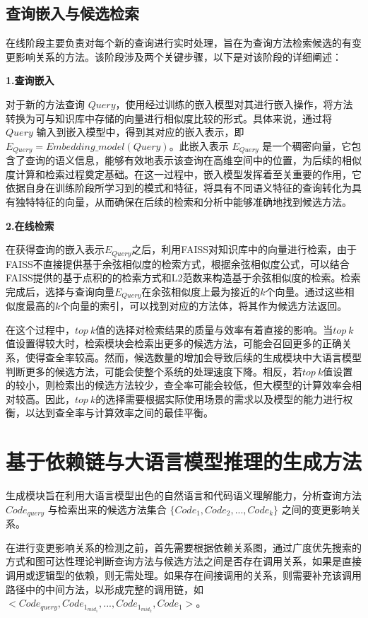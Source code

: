 \subsection{查询嵌入与候选检索}

在线阶段主要负责对每个新的查询进行实时处理，旨在为查询方法检索候选的有变更影响关系的方法。该阶段涉及两个关键步骤，以下是对该阶段的详细阐述：

\noindent \textbf{1.查询嵌入}

对于新的方法查询 $Query$，使用经过训练的嵌入模型对其进行嵌入操作，将方法转换为可与知识库中存储的向量进行相似度比较的形式。具体来说，通过将 $Query$ 输入到嵌入模型中，得到其对应的嵌入表示，即 $E_{Query}=Embedding\_model(Query)$。此嵌入表示 $E_{Query}$ 是一个稠密向量，它包含了查询的语义信息，能够有效地表示该查询在高维空间中的位置，为后续的相似度计算和检索过程奠定基础。在这一过程中，嵌入模型发挥着至关重要的作用，它依据自身在训练阶段所学习到的模式和特征，将具有不同语义特征的查询转化为具有独特特征的向量，从而确保在后续的检索和分析中能够准确地找到候选方法。

\noindent \textbf{2.在线检索}

在获得查询的嵌入表示$E_{Query}$之后，利用FAISS对知识库中的向量进行检索，由于FAISS不直接提供基于余弦相似度的检索方式，根据余弦相似度公式，可以结合FAISS提供的基于点积的的检索方式和L2范数来构造基于余弦相似度的检索。检索完成后，选择与查询向量$E_{Query}$在余弦相似度上最为接近的$k$个向量。通过这些相似度最高的$k$个向量的索引，可以找到对应的方法体，将其作为候选方法返回。

在这个过程中，$top\ k$值的选择对检索结果的质量与效率有着直接的影响。当$top\ k$值设置得较大时，检索模块会检索出更多的候选方法，可能会召回更多的正确关系，使得查全率较高。然而，候选数量的增加会导致后续的生成模块中大语言模型判断更多的候选方法，可能会使整个系统的处理速度下降。相反，若$top\ k$值设置的较小，则检索出的候选方法较少，查全率可能会较低，但大模型的计算效率会相对较高。因此，$top\ k$的选择需要根据实际使用场景的需求以及模型的能力进行权衡，以达到查全率与计算效率之间的最佳平衡。

\section{基于依赖链与大语言模型推理的生成方法}

生成模块旨在利用大语言模型出色的自然语言和代码语义理解能力，分析查询方法 $Code_{query}$ 与检索出来的候选方法集合 $\{Code_1, Code_2, ..., Code_k\}$ 之间的变更影响关系。



在进行变更影响关系的检测之前，首先需要根据依赖关系图，通过广度优先搜索的方式和图可达性理论判断查询方法与候选方法之间是否存在调用关系，如果是直接调用或逻辑型的依赖，则无需处理。如果存在间接调用的关系，则需要补充该调用路径中的中间方法，以形成完整的调用链，如$<Code_{query},Code_{1_{mid_1}},...,Code_{1_{mid_2}},Code_1>$。


